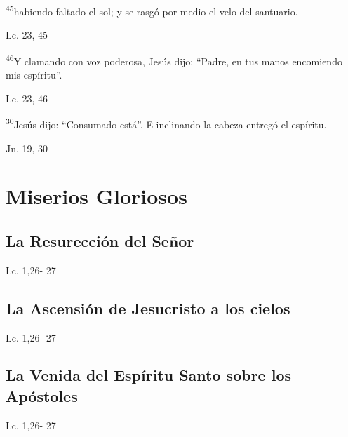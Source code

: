 \documentclass[a4paper,11pt,sans]{article}
\begin{document}
      \textsuperscript{45}habiendo faltado el sol; y se rasgó por medio el velo del santuario.
      \begin{center}
        Lc. 23, 45
      \end{center}

      \textsuperscript{46}Y clamando con voz poderosa, Jesús dijo: ``Padre, en tus manos encomiendo mis espíritu''.
      \begin{center}
        Lc. 23, 46 
      \end{center}

      \textsuperscript{30}Jesús dijo: ``Consumado está''. E inclinando la cabeza entregó el espíritu.
      \begin{center}
        Jn. 19, 30
      \end{center}
 
    \newpage
         
  \section*{\hfil Miserios Gloriosos \hfil}
    \subsection*{\hfil La Resurección del Señor \hfil}
      \begin{multicols}{2}

      \columnbreak
                           
      \end{multicols}
      \begin{center}
        Lc. 1,26- 27           
      \end{center}
    \subsection*{\hfil La Ascensión de Jesucristo a los cielos \hfil}
      \begin{multicols}{2}

      \columnbreak
                           
      \end{multicols}         
      \begin{center}
        Lc. 1,26- 27           
      \end{center}
    \subsection*{\hfil La Venida del Espíritu Santo sobre los Apóstoles \hfil}
      \begin{multicols}{2}

      \columnbreak
                           
      \end{multicols}         
      \begin{center}
        Lc. 1,26- 27           
      \end{center}
\end{document}
